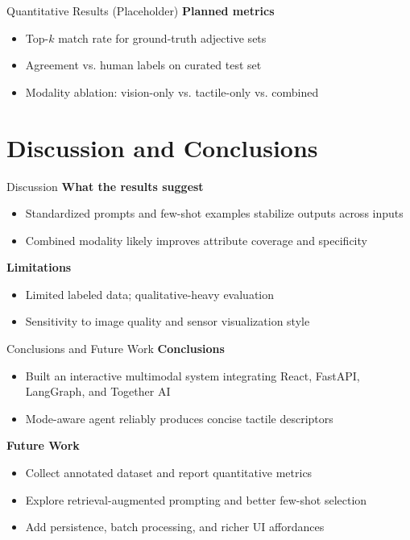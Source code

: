 \documentclass[aspectratio=169,xcolor=dvipsnames]{beamer}
\newcommand{\imgph}[2]{\fbox{\parbox[c][#2][c]{#1}{\centering \small Image Placeholder}}}
\begin{document}
\begin{frame}{Quantitative Results (Placeholder)}
    \textbf{Planned metrics}
    \begin{itemize}
        \item Top-$k$ match rate for ground-truth adjective sets
        \item Agreement vs. human labels on curated test set
        \item Modality ablation: vision-only vs. tactile-only vs. combined
    \end{itemize}
    \vspace{0.4cm}
    \begin{center}
        \imgph{11.5cm}{5.0cm}
    \end{center}
\end{frame}

\section{Discussion and Conclusions}

\begin{frame}{Discussion}
    \textbf{What the results suggest}
    \begin{itemize}
        \item Standardized prompts and few-shot examples stabilize outputs across inputs
        \item Combined modality likely improves attribute coverage and specificity
    \end{itemize}
    \vspace{0.3cm}
    \textbf{Limitations}
    \begin{itemize}
        \item Limited labeled data; qualitative-heavy evaluation
        \item Sensitivity to image quality and sensor visualization style
    \end{itemize}
\end{frame}

\begin{frame}{Conclusions and Future Work}
    \textbf{Conclusions}
    \begin{itemize}
        \item Built an interactive multimodal system integrating React, FastAPI, LangGraph, and Together AI
        \item Mode-aware agent reliably produces concise tactile descriptors
    \end{itemize}
    \vspace{0.3cm}
    \textbf{Future Work}
    \begin{itemize}
        \item Collect annotated dataset and report quantitative metrics
        \item Explore retrieval-augmented prompting and better few-shot selection
        \item Add persistence, batch processing, and richer UI affordances
    \end{itemize}
\end{frame}
\end{document}
